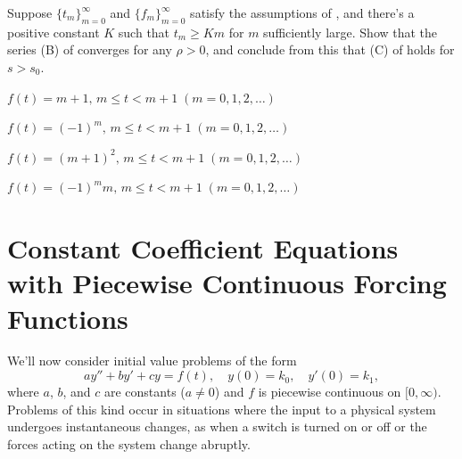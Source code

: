 \begin{exerciselist}
\item\label{exer:8.4.32}Suppose $\{t_m\}_{m=0}^\infty$ and
$\{f_m\}_{m=0}^\infty$ satisfy the assumptions of
, and
there's a positive constant $K$ such that $t_m\ge Km$ for $m$
sufficiently large. Show that the series  (B) of
 converges for any $\rho>0$, and conclude from
this that  (C) of  holds for $s>s_0$.


\item\label{exer:8.4.33}$f(t)=m+1,\,m\le t<m+1\; (m=0,1,2,\dots)$

\item\label{exer:8.4.34}$f(t)=(-1)^m,\,m\le t<m+1\; (m=0,1,2,\dots)$

\item\label{exer:8.4.35}$f(t)=(m+1)^2,\,m\le t<m+1\; (m=0,1,2,\dots)$

\item\label{exer:8.4.36}$f(t)=(-1)^mm,\,m\le t<m+1\; (m=0,1,2,\dots)$
\end{exerciselist}



\section[running={Piecewise Continuous Forcing Functions}]
{Constant Coefficient Equations with Piecewise Continuous Forcing Functions}
\label{sec:laplace_piecewise_forcing}

We'll now consider initial value problems of the form
\begin{equation}\label{eq:8.5.1}
 ay''+by'+cy=f(t), \quad  y(0)=k_0,\quad y'(0)=k_1,
\end{equation}
where $a$, $b$, and $c$ are constants ($a\ne0$) and $f$ is piecewise
continuous on $[0,\infty)$. Problems of this kind occur in situations
where the input to a physical system undergoes instantaneous changes,
as when a switch is turned on or off or the forces acting on the
system change abruptly.

